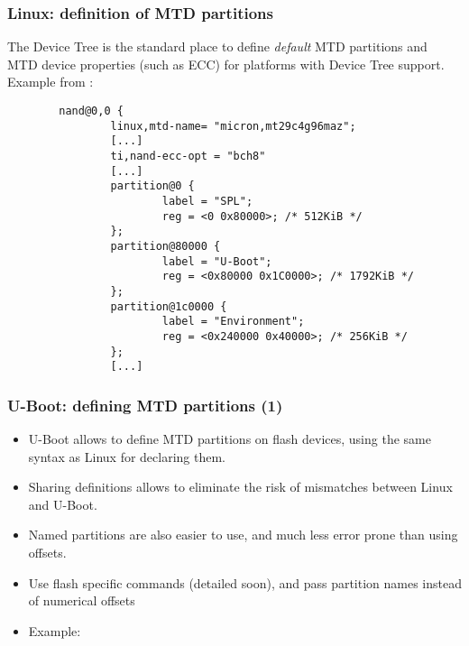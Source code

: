 \begin{frame}[fragile]
  \frametitle{Linux: definition of MTD partitions}
  \small
  The Device Tree is the standard place to define {\em default} MTD partitions
  and MTD device properties (such as ECC) for platforms with Device Tree support.\\
  Example from :
\begin{verbatim}
        nand@0,0 {
                linux,mtd-name= "micron,mt29c4g96maz";
                [...]
                ti,nand-ecc-opt = "bch8"
                [...]
                partition@0 {
                        label = "SPL";
                        reg = <0 0x80000>; /* 512KiB */
                };
                partition@80000 {
                        label = "U-Boot";
                        reg = <0x80000 0x1C0000>; /* 1792KiB */
                };
                partition@1c0000 {
                        label = "Environment";
                        reg = <0x240000 0x40000>; /* 256KiB */
                };
                [...]
\end{verbatim}
\end{frame}

\begin{frame}
  \frametitle{U-Boot: defining MTD partitions (1)}
  \begin{itemize}
  \item U-Boot allows to define MTD partitions on flash devices, using
        the same syntax as Linux for declaring them.
  \item Sharing definitions allows to eliminate the risk
        of mismatches between Linux and U-Boot.
  \item Named partitions are also easier to use, and much less error prone than using offsets.
  \item Use flash specific commands (detailed soon),
    and pass partition names instead of numerical offsets
  \item Example: 
  \end{itemize}
\end{frame}

